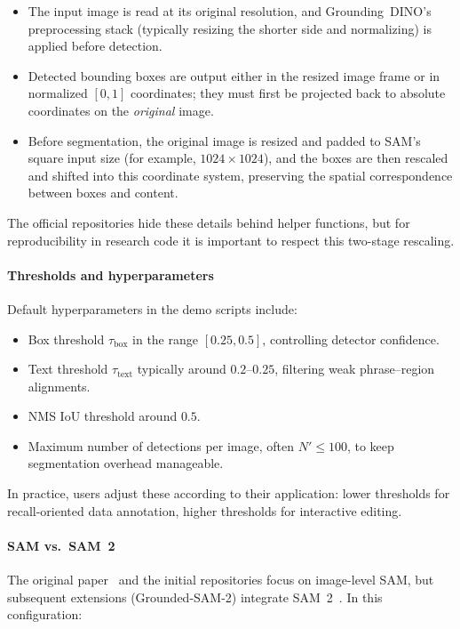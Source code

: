 \begin{enrichment}
\begin{enrichment}
		\begin{itemize}
			\item The input image is read at its original resolution, and Grounding~DINO’s preprocessing stack (typically resizing the shorter side and normalizing) is applied before detection.
			\item Detected bounding boxes are output either in the resized image frame or in normalized $[0,1]$ coordinates; they must first be projected back to absolute coordinates on the \emph{original} image.
			\item Before segmentation, the original image is resized and padded to SAM’s square input size (for example, $1024\times1024$), and the boxes are then rescaled and shifted into this coordinate system, preserving the spatial correspondence between boxes and content.
		\end{itemize}
		
		The official repositories hide these details behind helper functions, but for reproducibility in research code it is important to respect this two-stage rescaling.
		
		\paragraph{Thresholds and hyperparameters}
		Default hyperparameters in the demo scripts include:
		
		\begin{itemize}
			\item Box threshold $\tau_{\text{box}}$ in the range $[0.25, 0.5]$, controlling detector confidence.
			\item Text threshold $\tau_{\text{text}}$ typically around $0.2$--$0.25$, filtering weak phrase--region alignments.
			\item NMS IoU threshold around $0.5$.
			\item Maximum number of detections per image, often $N' \leq 100$, to keep segmentation overhead manageable.
		\end{itemize}
		
		In practice, users adjust these according to their application: lower thresholds for recall-oriented data annotation, higher thresholds for interactive editing.
		
		\paragraph{SAM vs.\ SAM~2}
		The original paper~\cite{ren2024_groundedsam} and the initial repositories focus on image-level SAM, but subsequent extensions (Grounded-SAM-2) integrate SAM~2~\cite{ravi2024_sam2}.
		In this configuration:
		

\end{enrichment}
\end{enrichment}
